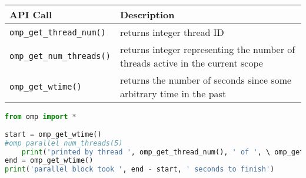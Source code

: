 \documentclass[letterpaper,12pt]{article} %
\begin{document}
\begin{center}
\begin{tabular}{ | p{5cm} | p{9cm} | }
\hline
\textbf{API Call} & \textbf{Description} \\
\hline
 \texttt{omp\_get\_thread\_num()} & returns integer thread ID \\ 
 \hline
 \texttt{omp\_get\_num\_threads()} & returns integer representing the number of threads active in the current scope\\  
 \hline
 \texttt{omp\_get\_wtime()} & returns the number of seconds since some arbitrary time in the past \\   
 \hline
\end{tabular}
\end{center}

 \begin{lstlisting}[language=Python]
from omp import *
 
start = omp_get_wtime()
#omp parallel num_threads(5)
	print('printed by thread ', omp_get_thread_num(), ' of ', \ omp_get_num_threads())
end = omp_get_wtime()
print('parallel block took ', end - start, ' seconds to finish')
\end{lstlisting}
\end{document}
